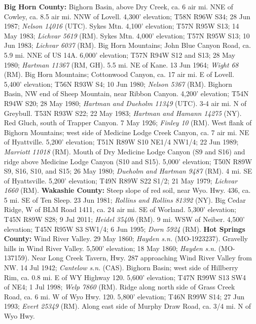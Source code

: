   \textbf{Big Horn County:}
Bighorn Basin, above Dry Creek, ca. 6 air mi. NNE of Cowley, ca. 8.5 air mi. NNW
of Lovell. 4,300' elevation; T58N R96W S34; 28 Jun 1987;
\textit{Nelson 14016} (UTC).
Sykes Mtn. 4,100' elevation; T57N R95W S13; 14 May 1983;
\textit{Lichvar 5619} (RM).
Sykes Mtn. 4,000' elevation; T57N R95W S13; 10 Jun 1983;
\textit{Lichvar 6037} (RM).
Big Horn Mountains; John Blue Canyon Road, ca. 5.9 mi. NNE of US 14A.
6,000' elevation; T57N R94W S12 and S13; 28 May 1980;
\textit{Hartman 11367} (RM, GH).
5.5 mi. NE of Kane. 13 Jun 1964; \textit{Wight 68} (RM).
Big Horn Mountains; Cottonwood Canyon, ca. 17 air mi. E of Lovell.
5,400' elevation; T56N R93W S4; 10 Jun 1980; \textit{Nelson 5367} (RM).
Bighorn Basin, NW end of Sheep Mountain, near Ribbon Canyon. 4,200' elevation;
T54N R94W S20; 28 May 1980; \textit{Hartman and Dueholm 11349} (UTC).
3-4 air mi. N of Greybull. T53N R93W S22; 22 May 1983;
\textit{Hartman and Hamann 14275} (NY).
Red Gluch, south of Trapper Canyon. 7 May 1926; \textit{Finley 10} (RM).
West flank of Bighorn Mountains; west side of Medicine Lodge Creek Canyon, ca.
7 air mi. NE of Hyattville. 5,200' elevation; T51N R89W S10 NE1/4 NW1/4;
22 Jun 1989; \textit{Marriott 11018} (RM).
Mouth of Dry Medicine Lodge Canyon (S9 and S16) and ridge above Medicine Lodge
Canyon (S10 and S15). 5,000' elevation; T50N R89W S9, S16, S10, and S15;
26 May 1980; \textit{Dueholm and Hartman 9487} (RM).
4 mi. SE of Hyattsville. 5,200' elevation; T49N R89W S22 S1/2; 21 May 1979;
\textit{Lichvar 1660} (RM).
  \textbf{Wakashie County:}
Steep slope of red soil, near Wyo. Hwy. 436, ca. 5 mi. SE of Ten Sleep.
23 Jun 1981; \textit{Rollins and Rollins 81392} (NY).
Big Cedar Ridge, W of BLM Road 1411, ca. 24 air mi. SE of Worland.
5,300' elevation; T45N R89W S28; 9 Jul 2011; \textit{Heidel 3540b} (RM).
9 mi. WSW of Neiber. 4,500' elevation; T45N R95W S3 SW1/4; 6 Jun 1995;
\textit{Dorn 5924} (RM).
  \textbf{Hot Springs County:}
Wind River Valley. 29 May 1860; \textit{Hayden s.n.} (MO-1923237).
Gravelly hills in Wind River Valley. 5,500' elevation; 18 May 1860;
\textit{Hayden s.n.} (MO-137159).
Near Long Creek Tavern, Hwy. 287 approaching Wind River Valley from NW.
14 Jul 1942; \textit{Cantelow s.n.} (CAS).
Bighorn Basin; west side of Hillberry Rim, ca. 0.8 mi. E of WY Highway 120.
5,600' elevation; T47N R99W S13 SW4 of NE4; 1 Jul 1998; \textit{Welp 7860} (RM).
Ridge along north side of Grass Creek Road, ca. 6 mi. W of Wyo Hwy. 120.
5,800' elevation; T46N R99W S14; 27 Jun 1993; \textit{Evert 25349} (RM).
Along east side of Murphy Draw Road, ca. 3/4 mi. N of Wyo Hwy.
